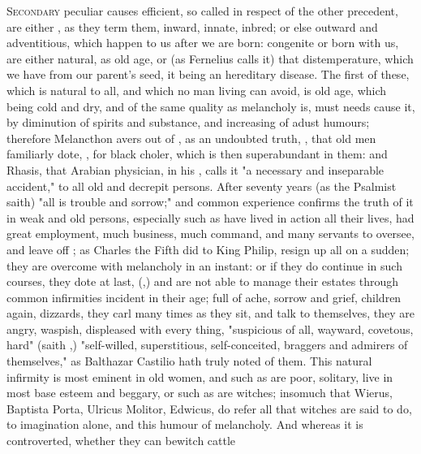 \lettrine{S}{econdary} peculiar causes efficient, so called in respect of the
other precedent, are either , as they term
them, inward, innate, inbred; or else outward and adventitious, which happen to
us after we are born: congenite or born with us, are either natural, as old
age, or  (as Fernelius calls it) that
distemperature, which we have from our parent's seed, it being an hereditary
disease. The first of these, which is natural to all, and which no man living
can avoid, is old age, which being cold and dry, and of
the same quality as melancholy is, must needs cause it, by diminution of
spirits and substance, and increasing of adust humours; therefore
Melancthon avers out of \Aristotle{}, as an undoubted truth,
, that old men familiarly dote, , for black choler, which is then superabundant in them: and
Rhasis, that Arabian physician, in his , calls it "a necessary and inseparable accident," to
all old and decrepit persons. After seventy years (as the Psalmist saith)
"all is trouble and sorrow;" and common experience
confirms the truth of it in weak and old persons, especially such as have lived
in action all their lives, had great employment, much business, much command,
and many servants to oversee, and leave off ; as
Charles the Fifth did to King Philip, resign up all on a
sudden; they are overcome with melancholy in an instant: or if they do continue
in such courses, they dote at last, (,) and are not able to
manage their estates through common infirmities incident in their age; full of
ache, sorrow and grief, children again, dizzards, they carl many times as they
sit, and talk to themselves, they are angry, waspish, displeased with every
thing, "suspicious of all, wayward, covetous, hard" (saith \Tully{},)
"self-willed, superstitious, self-conceited, braggers and admirers of
themselves," as Balthazar Castilio hath truly noted of
them. This natural infirmity is most eminent in old women,
and such as are poor, solitary, live in most base esteem and beggary, or such
as are witches; insomuch that Wierus, Baptista Porta, Ulricus Molitor, Edwicus,
do refer all that witches are said to do, to imagination alone, and this humour
of melancholy. And whereas it is controverted, whether they can bewitch cattle
